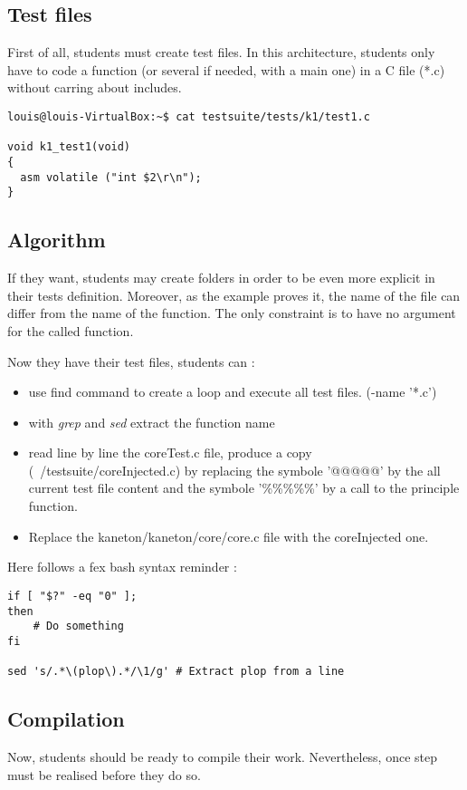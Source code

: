 \subsection{Test files}
First of all, students must create test files. In this architecture, students only have to code a function (or several if needed, with a main one) in a C file (*.c) without carring about includes.

\begin{verbatim}
louis@louis-VirtualBox:~$ cat testsuite/tests/k1/test1.c

void k1_test1(void)
{
  asm volatile ("int $2\r\n");
}
\end{verbatim}

\subsection{Algorithm}
If they want, students may create folders in order to be even more explicit in their tests definition. Moreover, as the example proves it, the name of the file can differ from the name of the function. The only constraint is to have no argument for the called function.

Now they have their test files, students can :
\begin{itemize}
\item use find command to create a loop and execute all test files. (-name '*.c')
\item with \textit{grep} and \textit{sed} extract the function name
\item read line by line the coreTest.c file, produce a copy (~/testsuite/coreInjected.c) by replacing the symbole '@@@@@' by the all current test file content and the symbole '\%\%\%\%\%' by a call to the principle function.
\item Replace the kaneton/kaneton/core/core.c file with the coreInjected one.
\end{itemize}

Here follows a fex bash syntax reminder :
\begin{verbatim}
if [ "$?" -eq "0" ];
then
	# Do something
fi

sed 's/.*\(plop\).*/\1/g' # Extract plop from a line
\end{verbatim}

\subsection{Compilation}
Now, students should be ready to compile their work. Nevertheless, once step must be realised before they do so.

